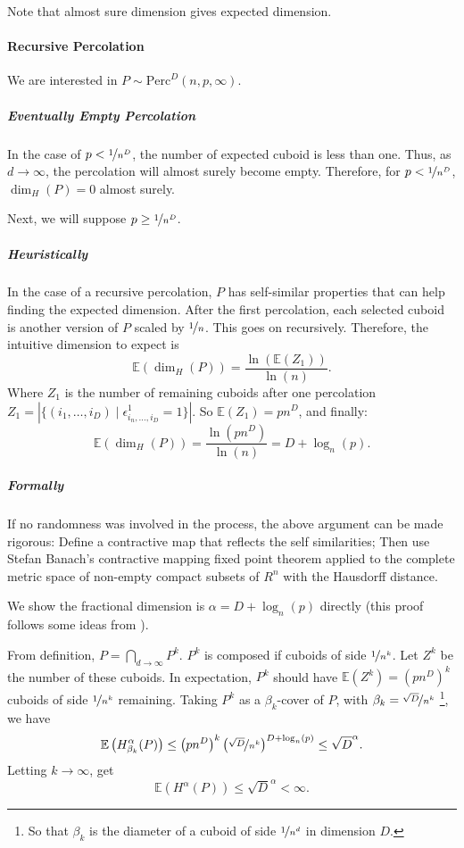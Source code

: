 Note that almost sure dimension gives expected dimension.

\paragraph{Recursive Percolation}
We are interested in $P \sim \text{Perc}^D(n,p,\infty)$.

\subparagraph{Eventually Empty Percolation}
In the case of $p < \nicefrac{1}{n^D}$, the number of expected cuboid is less than one.
Thus, as $d \to \infty$, the percolation will almost surely become empty.
Therefore, for $p < \nicefrac{1}{n^D}$, $\dim_H(P) = 0$ almost surely. 

Next, we will suppose $p \geq \nicefrac{1}{n^D}$.

\subparagraph{Heuristically}
In the case of a recursive percolation, $P$ has self-similar properties that can help finding the expected dimension.
After the first percolation, each selected cuboid is another version of $P$ scaled by $\nicefrac{1}{n}$.
This goes on recursively.
Therefore, the intuitive dimension to expect is 
$$\mathbb{E}(\dim_H(P)) = \frac{\ln(\mathbb{E}(Z_1))}{\ln(n)}.$$
Where $Z_1$ is the number of remaining cuboids after one percolation $Z_1 = \left| \{ (i_1,\dots,i_D) \mid \epsilon_{i_n,\dots,i_D}^1 = 1 \} \right|$.
So $\mathbb{E}(Z_1) = p n^D$, and finally:
$$\mathbb{E}(\dim_H(P)) = \frac{\ln(p n^D)}{\ln(n)} = D + \log_n(p).$$

\subparagraph{Formally}
If no randomness was involved in the process, the above argument can be made rigorous:
Define a contractive map that reflects the self similarities;
Then use Stefan Banach's contractive mapping fixed point theorem applied to the complete metric space of non-empty compact subsets of $R^n$ with the Hausdorff distance.

We show the fractional dimension is $\alpha = D + \log_n(p)$ directly (this proof follows some ideas from \cite[p. 34-35, ex. 2.7]{Falconer_1990}).

From definition, $P = \bigcap_{d \to \infty} P^k$.
$P^k$ is composed if cuboids of side $\nicefrac{1}{n^k}$.
Let $Z^k$ be the number of these cuboids.
In expectation, $P^k$ should have $\mathbb{E}(Z^k) = \left( p n^D \right)^k$ cuboids of side $\nicefrac{1}{n^k}$ remaining.
Taking $P^k$ as a $\beta_k$-cover of $P$, with $\beta_k = \nicefrac{\sqrt{D}}{n^k}$
\footnote{So that $\beta_k$ is the diameter of a cuboid of side $\nicefrac{1}{n^d}$ in dimension $D$.}, we have
$$\mathbb{E}\left( H_{\beta_k}^{\alpha}(P) \right) \leq \left( p n^D \right)^k \left( \nicefrac{\sqrt{D}}{n^k} \right)^{D + \log_n(p)} \leq \sqrt{D}^{\alpha}.$$
Letting $k \to \infty$, get
$$\mathbb{E} \left( H^{\alpha}(P) \right) \leq \sqrt{D}^{\alpha} < \infty.$$

